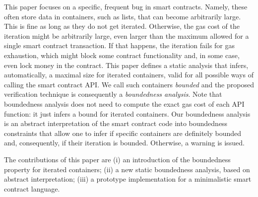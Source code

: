 This paper focuses on a specific, frequent bug in smart contracts.
Namely, these often store data in containers, such as lists,
that can become arbitrarily large. This is fine as long as they do not get
iterated. Otherwise, the gas cost of the iteration might be arbitrarily large,
even larger than the maximum allowed for a single smart contract transaction.
If that happens, the iteration fails for gas exhaustion, which might block
some contract functionality and, in some case,
even lock money in the contract. This paper defines
a static analysis that infers, automatically,
a maximal size for iterated containers,
valid for all possible ways of calling the smart contract API.
We call such containers \emph{bounded} and the proposed verification technique
is consequently a \emph{boundedness analysis}.
Note that boundedness analysis does not need to compute the exact gas cost of each API function:
it just infers a bound for iterated containers.
Our boundedness analysis is an abstract interpretation of the
smart contract code into boundedness constraints that
allow one to infer if specific containers are definitely bounded and,
consequently, if their iteration is bounded. Otherwise, a warning is issued.

The contributions of this paper are
(i) an introduction of the boundedness property for iterated containers;
(ii) a new static boundedness analysis, based on abstract interpretation;
(iii) a prototype implementation for a minimalistic smart contract language.






